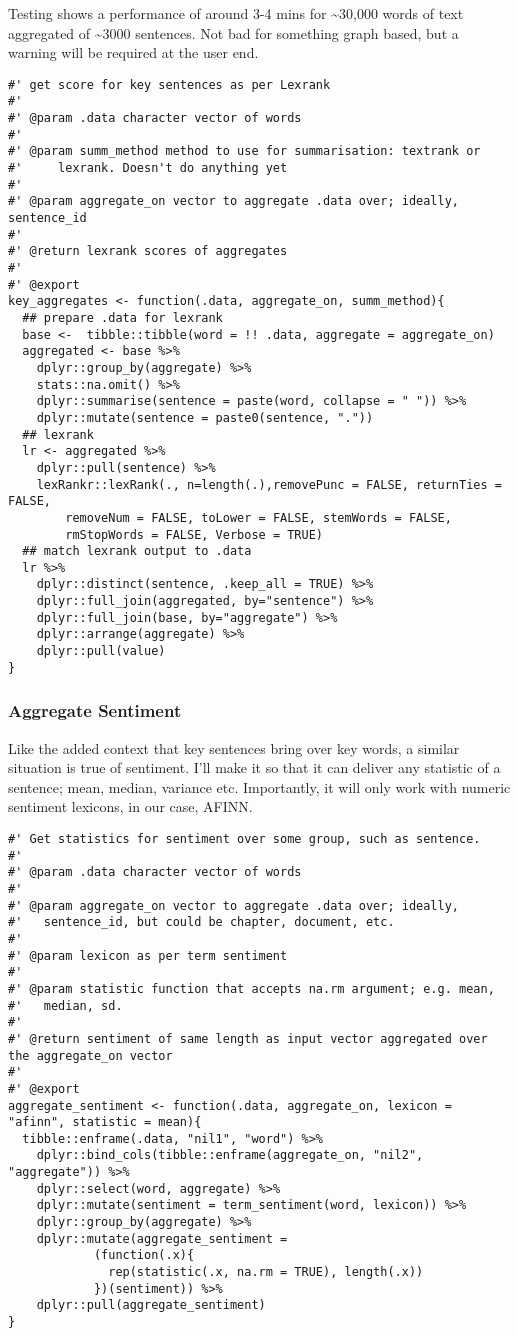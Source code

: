 \documentclass[a4paper, 11pt]{article}
\begin{document}
Testing shows a performance of around 3-4 mins for \textasciitilde{}30,000 words of
text aggregated of \textasciitilde{}3000 sentences. Not bad for something graph based,
but a warning will be required at the user end.
\begin{verbatim}
#' get score for key sentences as per Lexrank
#'
#' @param .data character vector of words
#'
#' @param summ_method method to use for summarisation: textrank or
#'     lexrank. Doesn't do anything yet
#'
#' @param aggregate_on vector to aggregate .data over; ideally, sentence_id
#'
#' @return lexrank scores of aggregates
#'
#' @export
key_aggregates <- function(.data, aggregate_on, summ_method){
  ## prepare .data for lexrank
  base <-  tibble::tibble(word = !! .data, aggregate = aggregate_on)
  aggregated <- base %>%
    dplyr::group_by(aggregate) %>%
    stats::na.omit() %>%
    dplyr::summarise(sentence = paste(word, collapse = " ")) %>%
    dplyr::mutate(sentence = paste0(sentence, "."))
  ## lexrank
  lr <- aggregated %>%
    dplyr::pull(sentence) %>%
    lexRankr::lexRank(., n=length(.),removePunc = FALSE, returnTies = FALSE,
	    removeNum = FALSE, toLower = FALSE, stemWords = FALSE,
	    rmStopWords = FALSE, Verbose = TRUE)
  ## match lexrank output to .data
  lr %>%
    dplyr::distinct(sentence, .keep_all = TRUE) %>% 
    dplyr::full_join(aggregated, by="sentence") %>%
    dplyr::full_join(base, by="aggregate") %>%
    dplyr::arrange(aggregate) %>%
    dplyr::pull(value)
}
\end{verbatim}

\subsubsection{Aggregate Sentiment}
\label{sec:orgcec01d6}
Like the added context that key sentences bring over key words, a
similar situation is true of sentiment. I'll make it so that it can
deliver any statistic of a sentence; mean, median, variance etc.
Importantly, it will only work with numeric sentiment lexicons, in our
case, AFINN.
\begin{verbatim}
#' Get statistics for sentiment over some group, such as sentence.
#'
#' @param .data character vector of words
#'
#' @param aggregate_on vector to aggregate .data over; ideally,
#'   sentence_id, but could be chapter, document, etc.
#'
#' @param lexicon as per term sentiment
#'
#' @param statistic function that accepts na.rm argument; e.g. mean,
#'   median, sd.
#'
#' @return sentiment of same length as input vector aggregated over the aggregate_on vector
#'
#' @export
aggregate_sentiment <- function(.data, aggregate_on, lexicon = "afinn", statistic = mean){
  tibble::enframe(.data, "nil1", "word") %>%
    dplyr::bind_cols(tibble::enframe(aggregate_on, "nil2", "aggregate")) %>%
    dplyr::select(word, aggregate) %>%
    dplyr::mutate(sentiment = term_sentiment(word, lexicon)) %>%
    dplyr::group_by(aggregate) %>%
    dplyr::mutate(aggregate_sentiment =
		    (function(.x){
		      rep(statistic(.x, na.rm = TRUE), length(.x))
		    })(sentiment)) %>%
    dplyr::pull(aggregate_sentiment)
}
\end{verbatim}
\end{document}
